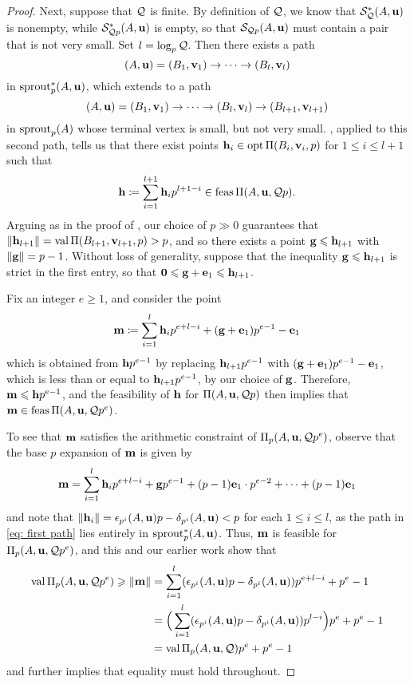 \documentclass{amsart}
\begin{document}
\begin{proof}
   Next, suppose that $\mathcal{Q}$ is finite.
   By definition of $\mathcal{Q}$, we know that $\mathcal{S}_{\mathcal{Q}}^{\ast}(A,\mathbf{u})$ is nonempty, while $\mathcal{S}^{\ast}_{\mathcal{Q} p}(A,\mathbf{u})$ is empty, so that $\mathcal{S}_{\mathcal{Q} p}(A,\mathbf{u})$ must contain a pair that is not very small.
   Set $l=\log_p \mathcal{Q}$.
   Then there exists a path
   \begin{equation}\label{eq: first path}
      (A,\mathbf{u}) = (B_1,\mathbf{v}_1) \to \cdots \to (B_{l}, \mathbf{v}_{l})
   \end{equation}
   in $\operatorname{sprout}_p^{\ast}(A,\mathbf{u})$, which extends to a path
   \[
      (A,\mathbf{u}) = (B_1,\mathbf{v}_1) \to \cdots \to (B_{l}, \mathbf{v}_{l}) \to (B_{l+1}, \mathbf{v}_{l+1})
   \]
   in $\operatorname{sprout}_p(A)$ whose terminal vertex is small, but not very small.
   , applied to this second path, tells us that there exist points $\mathbf{h}_i \in \operatorname{opt} \Pi(B_i, \mathbf{v}_i, p)$ for $1\le i\le l+1$ such that
   \[
      \mathbf{h} \coloneqq \sum_{i=1}^{l+1} \mathbf{h}_i p^{l+1-i} \in \operatorname{feas} \Pi(A,\mathbf{u}, \mathcal{Q} p).
   \]
   Arguing as in the proof of , our choice of $p \gg 0$ guarantees that $\| \mathbf{h}_{l+1} \| = \operatorname{val}\Pi(B_{l+1}, \mathbf{v}_{l+1},p) > p$, and so there exists a point $\mathbf{g} \leqslant \mathbf{h}_{l+1}$ with $\| \mathbf{g} \| = p-1$.
   Without loss of generality, suppose that the inequality $\mathbf{g} \leqslant \mathbf{h}_{l+1}$ is strict in the first entry, so that $\mathbf{0} \leqslant \mathbf{g} + \mathbf{e}_1 \leqslant \mathbf{h}_{l+1}$.

   Fix an integer $e \geq 1$, and consider the point
   \[
      \mathbf{m} \coloneqq \sum_{i=1}^{l} \mathbf{h}_i p^{e+l-i} + (\mathbf{g}+\mathbf{e}_1)p^{e-1} - \mathbf{e}_1
   \]
   which is obtained from $\mathbf{h}p^{e-1}$ by replacing $\mathbf{h}_{l+1}p^{e-1}$ with  $(\mathbf{g}+\mathbf{e}_1)p^{e-1} - \mathbf{e}_1$, which is less than or equal to $\mathbf{h}_{l+1} p^{e-1}$, by our choice of $\mathbf{g}$.
   Therefore, $\mathbf{m} \leqslant \mathbf{h}p^{e-1}$, and the feasibility of $\mathbf{h}$ for $\Pi(A,\mathbf{u}, \mathcal{Q} p)$ then implies that $\mathbf{m} \in \operatorname{feas} \Pi(A,\mathbf{u}, \mathcal{Q} p^e)$.

   To see that $\mathbf{m}$ satisfies the arithmetic constraint of $\Pi_p(A,\mathbf{u}, \mathcal{Q} p^e)$, observe that the base $p$ expansion of $\mathbf{m}$ is given by
   \[
      \mathbf{m} = \sum_{i=1}^{l} \mathbf{h}_i p^{e+l-i} + \mathbf{g}p^{e-1} + (p-1) \mathbf{e}_1 \cdot p^{e-2} + \cdots + (p-1)\mathbf{e}_1
   \]
   and note that $\| \mathbf{h}_i \| = \epsilon_{p^i}(A,\mathbf{u})p-\delta_{p^i}(A,\mathbf{u}) < p$ for each $1 \leq i \leq l$, as the path in \eqref{eq: first path} lies entirely in $\operatorname{sprout}_p^{\ast}(A,\mathbf{u})$.
   Thus, $\mathbf{m}$ is feasible for $\Pi_p(A,\mathbf{u}, \mathcal{Q} p^e)$, and this and our earlier work show that
   \begin{align*}
     \operatorname{val} \Pi_p(A,\mathbf{u}, \mathcal{Q} p^e) \geqslant \| \mathbf{m} \| & = \sum_{i=1}^l (\epsilon_{p^i}(A,\mathbf{u})p-\delta_{p^i}(A,\mathbf{u})) p^{e+l-i} + p^e-1 \\
                                                     & = \Big ( \sum_{i=1}^l (\epsilon_{p^i}(A,\mathbf{u})p-\delta_{p^i}(A,\mathbf{u})) p^{l-i} \Big ) p^e + p^e-1 \\
                                                     & = \operatorname{val} \Pi_p(A,\mathbf{u}, \mathcal{Q}) p^e + p^e-1
   \end{align*}
   and  further implies that equality must hold throughout.
\end{proof}
\end{document}
